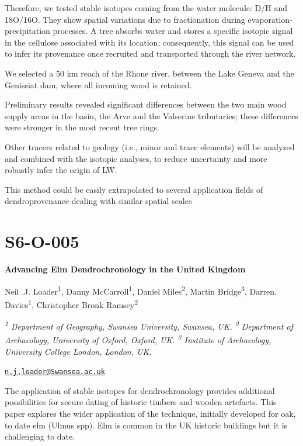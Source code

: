 \documentclass[
]{book}
\begin{document}
Therefore, we tested stable isotopes coming from the water molecule: D/H and 18O/16O. They show spatial variations due to fractionation during evaporation-precipitation processes. A tree absorbs water and stores a specific isotopic signal in the cellulose associated with its location; consequently, this signal can be used to infer its provenance once recruited and transported through the river network.

We selected a 50 km reach of the Rhone river, between the Lake Geneva and the Genissiat dam, where all incoming wood is retained.

Preliminary results revealed significant differences between the two main wood supply areas in the basin, the Arve and the Valserine tributaries; these differences were stronger in the most recent tree rings.

Other tracers related to geology (i.e., minor and trace elements) will be analyzed and combined with the isotopic analyses, to reduce uncertainty and more robustly infer the origin of LW.

This method could be easily extrapolated to several application fields of dendroprovenance dealing with similar spatial scales

\hypertarget{s6-o-005}{%
\section*{S6-O-005}\label{s6-o-005}}

\textbf{Advancing Elm Dendrochronology in the United Kingdom}

Neil .J. Loader\textsuperscript{1}, Danny McCarroll\textsuperscript{1}, Daniel Miles\textsuperscript{2}, Martin Bridge\textsuperscript{3}, Darren. Davies\textsuperscript{1}, Christopher Bronk Ramsey\textsuperscript{2}

\emph{\textsuperscript{1} Department of Geography, Swansea University, Swansea, UK. \textsuperscript{2} Department of Archaeology, University of Oxford, Oxford, UK. \textsuperscript{3} Institute of Archaeology, University College London, London, UK.}

\href{mailto:n.j.loader@Swansea.ac.uk}{\nolinkurl{n.j.loader@Swansea.ac.uk}}

The application of stable isotopes for dendrochronology provides additional possibilities for secure dating of historic timbers and wooden artefacts. This paper explores the wider application of the technique, initially developed for oak, to date elm (Ulmus spp). Elm is common in the UK historic buildings but it is challenging to date.
\end{document}
